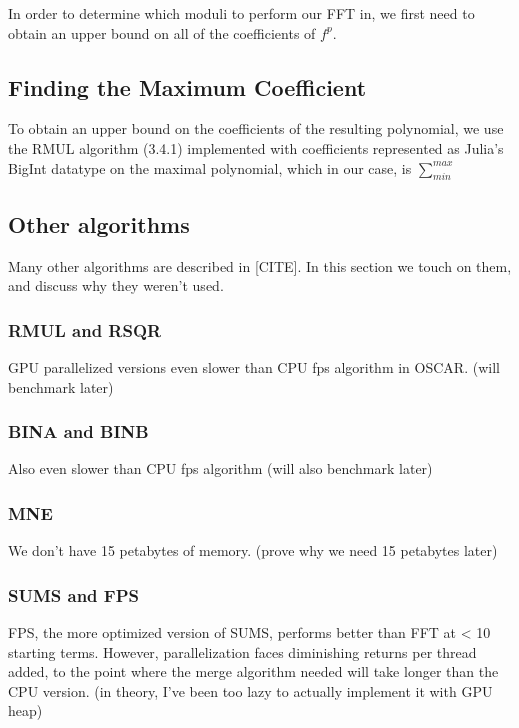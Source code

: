 In order to determine which moduli to perform our FFT in, we first need to obtain an upper bound on all of the coefficients of $f ^ p$.

\subsection{Finding the Maximum Coefficient}
To obtain an upper bound on the coefficients of the resulting polynomial, we use the RMUL algorithm (3.4.1) implemented with coefficients represented as Julia's BigInt datatype on the maximal polynomial, which in our case, is $\sum_{min}^{max}$

\subsection{Other algorithms}
Many other algorithms are described in [CITE]. In this section we touch on them, and discuss why they
weren't used.

\subsubsection{RMUL and RSQR}
GPU parallelized versions even slower than CPU fps algorithm in OSCAR. (will benchmark later)

\subsubsection{BINA and BINB}
Also even slower than CPU fps algorithm (will also benchmark later)

\subsubsection{MNE}
We don't have 15 petabytes of memory. (prove why we need 15 petabytes later)

\subsubsection{SUMS and FPS}
FPS, the more optimized version of SUMS, performs better than FFT at < 10 starting terms. However,
parallelization faces diminishing returns per thread added, to the point where the merge algorithm needed
will take longer than the CPU version. (in theory, I've been too lazy to actually implement it with GPU 
heap)